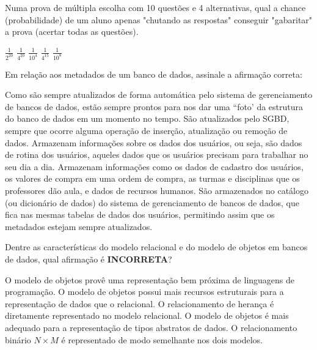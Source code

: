 \documentclass[12pt, addpoints]{exam}
\begin{document}
\begin{questions}
\question

Numa prova de múltipla escolha com 10 questões e 4 alternativas, qual a chance (probabilidade) de um aluno apenas "chutando as respostas" conseguir "gabaritar" a prova (acertar todas as questões).


\begin{choices}
\choice \( \frac{1}{2^{20}} \)
\choice \( \frac{1}{4^{20}} \)
\choice \( \frac{1}{10^{4}} \)
\choice \( \frac{1}{4^{15}} \)
\choice \( \frac{1}{10^{8}} \)
\end{choices}

\question

Em relação aos metadados de um banco de dados, assinale a afirmação correta:
\begin{choices}
\choice Como são sempre atualizados de forma automática pelo sistema de gerenciamento de bancos de dados, estão sempre prontos para nos dar uma ``foto' da estrutura do banco de dados em um momento no tempo.
\choice São atualizados pelo SGBD, sempre que ocorre alguma operação de inserção, atualização ou remoção de dados.
\choice Armazenam informações sobre os dados dos usuários, ou seja, são dados de rotina dos usuários, aqueles dados que os usuários precisam para trabalhar no seu dia a dia.
\choice Armazenam informações como os dados de cadastro dos usuários, os valores de compra em uma ordem de compra, as turmas e disciplinas que os professores dão aula, e dados de recursos humanos.
\choice São armazenados no catálogo (ou dicionário de dados) do sistema de gerenciamento de bancos de dados, que fica nas mesmas tabelas de dados dos usuários, permitindo assim que os metadados estejam sempre atualizados.
\end{choices}

\question

Dentre as características do modelo relacional e do modelo de objetos em bancos de dados, qual afirmação é \textbf{INCORRETA}?


\begin{choices}
\choice O modelo de objetos provê uma representação bem próxima de linguagens de programação.
\choice O modelo de objetos possui mais recursos estruturais para a representação de dados que o relacional.
\choice O relacionamento de herança é diretamente representado no modelo relacional.
\choice O modelo de objetos é mais adequado para a representação de tipos abstratos de dados.
\choice O relacionamento binário \( N \times M \) é representado de modo semelhante nos dois modelos.	
\end{choices}


\end{questions}
\end{document}
